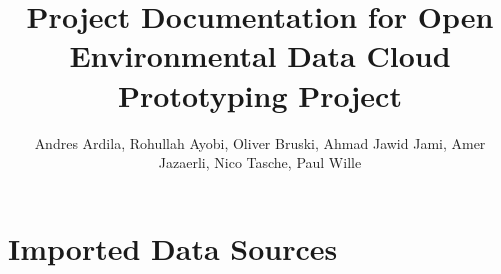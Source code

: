 \documentclass{llncs}
\begin{document}
\title{Project Documentation for Open Environmental Data Cloud Prototyping Project}
%
%
\author{Andres Ardila, Rohullah Ayobi, Oliver Bruski, Ahmad Jawid Jami, Amer Jazaerli, Nico Tasche, Paul Wille}


\maketitle              %

\begin{abstract}
\end{abstract}

\pagebreak

\tableofcontents

\clearpage











%
%
%


\begin{thebibliography}{}  %

%
%


\end{thebibliography}

\appendix

\section{Imported Data Sources}
\end{document}
